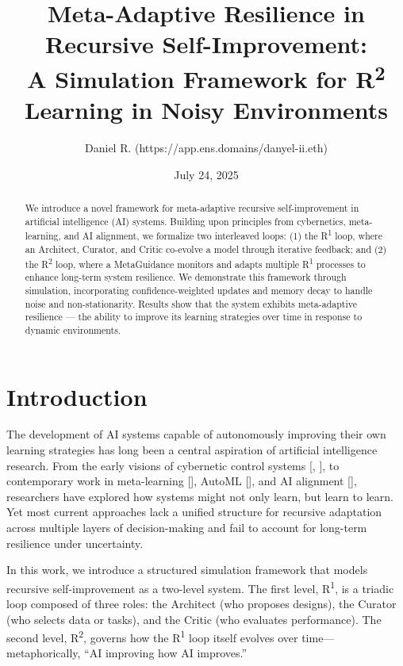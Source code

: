 \documentclass{article}
\title{Meta-Adaptive Resilience in Recursive Self-Improvement: \\ A Simulation Framework for R\textsuperscript{2} Learning in Noisy Environments}
\author{Daniel R. (https://app.ens.domains/danyel-ii.eth)} %
\date{July 24, 2025} %
\begin{document}
\maketitle

\begin{abstract}
We introduce a novel framework for meta-adaptive recursive self-improvement in artificial intelligence (AI) systems. Building upon principles from cybernetics, meta-learning, and AI alignment, we formalize two interleaved loops: (1) the R\textsuperscript{1} loop, where an Architect, Curator, and Critic co-evolve a model through iterative feedback; and (2) the R\textsuperscript{2} loop, where a MetaGuidance monitors and adapts multiple R\textsuperscript{1} processes to enhance long-term system resilience. We demonstrate this framework through simulation, incorporating confidence-weighted updates and memory decay to handle noise and non-stationarity. Results show that the system exhibits meta-adaptive resilience — the ability to improve its learning strategies over time in response to dynamic environments.
\end{abstract}

\section{Introduction}
The development of AI systems capable of autonomously improving their own learning strategies has long been a central aspiration of artificial intelligence research. From the early visions of cybernetic control systems [\cite{wiener1948cybernetics}, \cite{ashby1956ic}], to contemporary work in meta-learning [\cite{finn2017maml}], AutoML [\cite{elsken2019neural}], and AI alignment [\cite{christiano2018amplification}], researchers have explored how systems might not only learn, but learn to learn. Yet most current approaches lack a unified structure for recursive adaptation across multiple layers of decision-making and fail to account for long-term resilience under uncertainty.

In this work, we introduce a structured simulation framework that models recursive self-improvement as a two-level system. The first level, R\textsuperscript{1}, is a triadic loop composed of three roles: the Architect (who proposes designs), the Curator (who selects data or tasks), and the Critic (who evaluates performance). The second level, R\textsuperscript{2}, governs how the R\textsuperscript{1} loop itself evolves over time—metaphorically, “AI improving how AI improves.”
\end{document}
